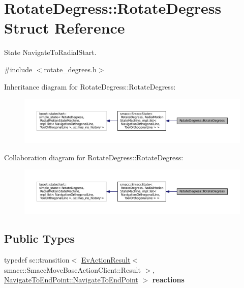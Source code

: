 \hypertarget{structRotateDegress_1_1RotateDegress}{}\section{Rotate\+Degress\+:\+:Rotate\+Degress Struct Reference}
\label{structRotateDegress_1_1RotateDegress}


State Navigate\+To\+Radial\+Start.  




{\ttfamily \#include $<$rotate\+\_\+degrees.\+h$>$}



Inheritance diagram for Rotate\+Degress\+:\+:Rotate\+Degress\+:
\nopagebreak
\begin{figure}[H]
\begin{center}
\leavevmode
\includegraphics[width=350pt]{structRotateDegress_1_1RotateDegress__inherit__graph}
\end{center}
\end{figure}


Collaboration diagram for Rotate\+Degress\+:\+:Rotate\+Degress\+:
\nopagebreak
\begin{figure}[H]
\begin{center}
\leavevmode
\includegraphics[width=350pt]{structRotateDegress_1_1RotateDegress__coll__graph}
\end{center}
\end{figure}
\subsection*{Public Types}
\begin{DoxyCompactItemize}
\item 
typedef sc\+::transition$<$ \hyperlink{structsmacc_1_1EvActionResult}{Ev\+Action\+Result}$<$ smacc\+::\+Smacc\+Move\+Base\+Action\+Client\+::\+Result $>$, \hyperlink{structNavigateToEndPoint_1_1NavigateToEndPoint}{Navigate\+To\+End\+Point\+::\+Navigate\+To\+End\+Point} $>$ {\bfseries reactions}\hypertarget{structRotateDegress_1_1RotateDegress_ae589629aa225feb6a2bc2bc702bd088f}{}\label{structRotateDegress_1_1RotateDegress_ae589629aa225feb6a2bc2bc702bd088f}

\end{DoxyCompactItemize}
